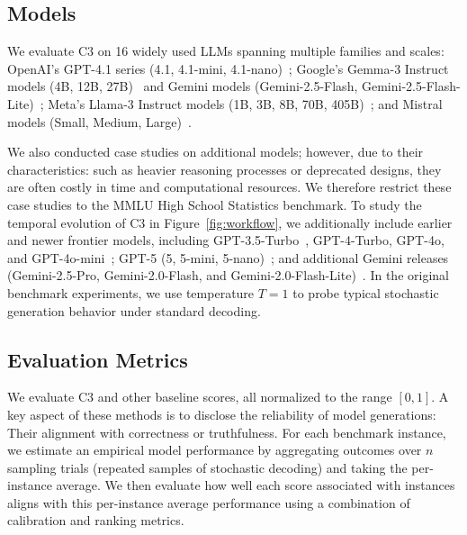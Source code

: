 \documentclass[11pt]{article}
\theoremstyle{plain}
\theoremstyle{definition}
\theoremstyle{remark}
\newif\ifrevisionmarkup
\DeclareRobustCommand{\revisioncolor}{\ifrevisionmarkup\color{red}\fi}
\DeclareRobustCommand{\revised}[1]{{\revisioncolor #1}}
\begin{document}
\subsection{Models}\label{app:Models}

We evaluate C3 on 16 widely used LLMs spanning multiple families and scales: OpenAI’s GPT-4.1 series (4.1, 4.1-mini, 4.1-nano)~\citep{openai2024gpt4technicalreport}; Google’s Gemma-3 Instruct models (4B, 12B, 27B)~\citep{gemmateam2025gemma3technicalreport} and Gemini models (Gemini-2.5-Flash, Gemini-2.5-Flash-Lite)~\citep{comanici2025gemini25pushingfrontier}; Meta’s Llama-3 Instruct models (1B, 3B, 8B, 70B, 405B)~\citep{grattafiori2024llama3herdmodels}; and Mistral models (Small, Medium, Large)~\citep{jiang2024mixtralexperts}.

We also conducted case studies on additional models; however, due to their characteristics: such as heavier reasoning processes or deprecated designs, they are often costly in time and computational resources. We therefore restrict these case studies to the MMLU High School Statistics benchmark. To study the temporal evolution of C3 in Figure~\ref{fig:workflow}, we additionally include earlier and newer frontier models, including GPT-3.5-Turbo~\citep{brown2020languagemodelsfewshotlearners}, GPT-4-Turbo, GPT-4o, and GPT-4o-mini~\citep{openai2024gpt4ocard}; GPT-5 (5, 5-mini, 5-nano)~\citep{singh2025openaigpt5card}; and additional Gemini releases (Gemini-2.5-Pro, Gemini-2.0-Flash, and Gemini-2.0-Flash-Lite)~\citep{geminiteam2025geminifamilyhighlycapable}. \revised{In the original benchmark experiments, we use temperature $T{=}1$} to probe typical stochastic generation behavior under standard decoding.
\subsection{Evaluation Metrics} \label{app:Evaluation Metrics}
We evaluate C3 and other baseline scores, all normalized to the range $[0, 1]$. A key aspect of these methods is to disclose the reliability of model generations: Their alignment with correctness or truthfulness. For each benchmark instance, we estimate an empirical model performance by aggregating outcomes over $n$ sampling trials (repeated samples of stochastic decoding) and taking the per-instance average. We then evaluate how well each score associated with instances aligns with this per-instance average performance using a combination of calibration and ranking metrics.
\end{document}
